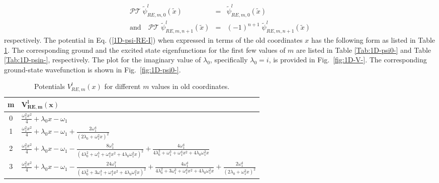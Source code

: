 \documentclass[a4paper, 12pt]{article}
\newcommand{\td}[1]{\tilde{#1}}
\begin{document}
\begin{eqnarray}
		\mathcal{PT}\;\td{\psi}_{RE,m,0}^l(\td{x})&=&\td{\psi}_{RE,m,0}^l(\td{x})\nonumber\\
	\mbox{and} \quad  \mathcal{PT}\;\td{\psi}_{RE,m,n+1}^l(\td{x})&=&(-1)^{n+1}\;\td{\psi}_{RE,m,n+1}^l(\td{x})
\end{eqnarray}
respectively. The potential in Eq. (\ref{1D-psi-RE-I}) when expressed in terms of the old coordinates \( x \) 
has the following form as listed in Table \ref{Tab:1D-V-}. The corresponding ground and the excited state eigenfunctions for the first few values of \( m \) are listed in Table \ref{Tab:1D-psi0-} and Table \ref{Tab:1D-psin-}, respectively. 
The plot for the imaginary value of \(\lambda_0\), specifically \(\lambda_0 = i\), is provided in Fig.~\ref{fig:1D-V-}. The corresponding ground-state wavefunction is shown in Fig.~\ref{fig:1D-psi0-}.



\begin{table}[htp]%
  \centering
  \renewcommand{\arraystretch}{1.5} %
  \setlength{\tabcolsep}{1em} %
  \begin{tabularx}{\columnwidth}{|c|X|}
  \toprule
  {\bf m} & $\mathbf{V_{RE,m}^l(x)}$ \\
  \toprule
  0 & $\frac{\omega_1^2 x^2}{4} + \lambda_0 x - \omega_1$ \\
  \hline
  1 & $\frac{\omega_1^2 x^2}{4} + \lambda_0 x - \omega_1 + \frac{2 \omega_1^4}{(2 \lambda_0 + \omega_1^2 x)^2}$ \\
  \hline
  2 & $\frac{\omega_1^2 x^2}{4} + \lambda_0 x - \omega_1 - \frac{8 \omega_1^7}{\left(4 \lambda_0^2 + \omega_1^3 + \omega_1^4 x^2 + 4 \lambda_0 \omega_1^2 x\right)^2} + \frac{4 \omega_1^4}{4 \lambda_0^2 + \omega_1^3 + \omega_1^4 x^2 + 4 \lambda_0 \omega_1^2 x}$ \\
  \hline
  3 & $\frac{\omega_1^2 x^2}{4} + \lambda_0 x - \omega_1 - \frac{24 \omega_1^7}{\left(4 \lambda_0^2 + 3 \omega_1^3 + \omega_1^4 x^2 + 4 \lambda_0 \omega_1^2 x\right)^2} + \frac{4 \omega_1^4}{4 \lambda_0^2 + 3 \omega_1^3 + \omega_1^4 x^2 + 4 \lambda_0 \omega_1^2 x} + \frac{2 \omega_1^4}{(2 \lambda_0 + \omega_1^2 x)^2}$ \\
  \bottomrule
  \end{tabularx}
  \caption{Potentials $V_{RE,m}^l(x)$ for different $m$ values in old coordinates.}
  \label{Tab:1D-V-}
\end{table}
\end{document}
